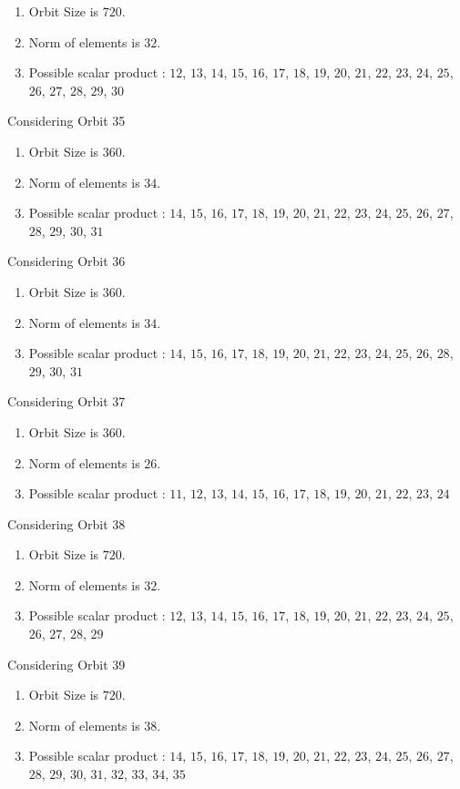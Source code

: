 \documentclass[12pt]{article}
\begin{document}
\begin{enumerate}
\item Orbit Size is $720$.
\item Norm of elements is $32$.
\item Possible scalar product : $12$, $13$, $14$, $15$, $16$, $17$, $18$, $19$, $20$, $21$, $22$, $23$, $24$, $25$, $26$, $27$, $28$, $29$, $30$
\end{enumerate}
Considering Orbit 35
\begin{enumerate}
\item Orbit Size is $360$.
\item Norm of elements is $34$.
\item Possible scalar product : $14$, $15$, $16$, $17$, $18$, $19$, $20$, $21$, $22$, $23$, $24$, $25$, $26$, $27$, $28$, $29$, $30$, $31$
\end{enumerate}
Considering Orbit 36
\begin{enumerate}
\item Orbit Size is $360$.
\item Norm of elements is $34$.
\item Possible scalar product : $14$, $15$, $16$, $17$, $18$, $19$, $20$, $21$, $22$, $23$, $24$, $25$, $26$, $28$, $29$, $30$, $31$
\end{enumerate}
Considering Orbit 37
\begin{enumerate}
\item Orbit Size is $360$.
\item Norm of elements is $26$.
\item Possible scalar product : $11$, $12$, $13$, $14$, $15$, $16$, $17$, $18$, $19$, $20$, $21$, $22$, $23$, $24$
\end{enumerate}
Considering Orbit 38
\begin{enumerate}
\item Orbit Size is $720$.
\item Norm of elements is $32$.
\item Possible scalar product : $12$, $13$, $14$, $15$, $16$, $17$, $18$, $19$, $20$, $21$, $22$, $23$, $24$, $25$, $26$, $27$, $28$, $29$
\end{enumerate}
Considering Orbit 39
\begin{enumerate}
\item Orbit Size is $720$.
\item Norm of elements is $38$.
\item Possible scalar product : $14$, $15$, $16$, $17$, $18$, $19$, $20$, $21$, $22$, $23$, $24$, $25$, $26$, $27$, $28$, $29$, $30$, $31$, $32$, $33$, $34$, $35$
\end{enumerate}
\end{document}

